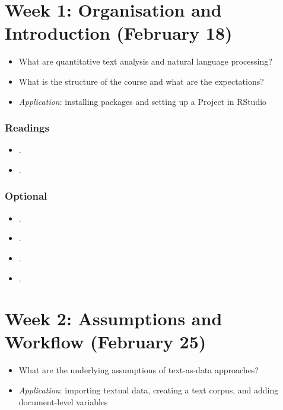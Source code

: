 \documentclass[abstract=on,parskip=full,headings=standardclasses,fontsize=11pt,paper=a4]{scrartcl}
\begin{document}
\tableofcontents

\section{Week 1: Organisation and Introduction (February 18)}

\begin{itemize}
\renewcommand\labelitemi{--}
\item What are quantitative text analysis and natural language processing?
\item What is the structure of the course and what are the expectations?
\item \textit{Application}: installing packages and setting up a Project in RStudio
\end{itemize}

\subsubsection*{Readings}
\begin{itemize}
\item {}.
\item {}.
\end{itemize}

\subsubsection*{Optional}
\begin{itemize}
\item {}.
\item {}.
\item {}.
\item {}.
\end{itemize}


\section{Week 2: Assumptions and  Workflow (February 25)}

\begin{itemize}
\renewcommand\labelitemi{--}
\item What are the underlying assumptions of text-as-data approaches?
\item \textit{Application}: importing textual data, creating a text corpus, and adding document-level variables
\end{itemize}
\end{document}
